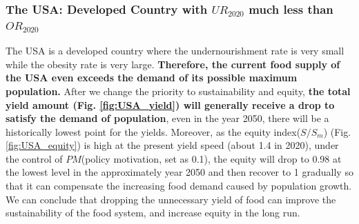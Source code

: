 \documentclass[12pt]{article}
\begin{document}
\subsubsection{The USA: Developed Country with $UR_{2020}$ much less than $OR_{2020}$}
The USA is a developed country where the undernourishment rate is very small while the obesity rate is very large. \textbf{Therefore, the current food supply of the USA even exceeds the demand of its possible maximum population.} After we change the priority to sustainability and equity, \textbf{the total yield amount (Fig. \ref{fig:USA_yield}) will generally receive a drop to satisfy the demand of population}, even in the year 2050, there will be a historically lowest point for the yields.  Moreover, as the equity index($S/S_m$) (Fig. \ref{fig:USA_equity}) is high at the present yield speed (about 1.4 in 2020), under the control of $PM$(policy motivation, set as 0.1), the equity will drop to 0.98 at the lowest level in the approximately year 2050 and then recover to 1 gradually so that it can compensate the increasing food demand caused by population growth. We can conclude that dropping the unnecessary yield of food can improve the sustainability of the food system, and increase equity in the long run.
\end{document}
